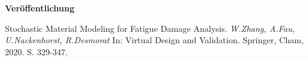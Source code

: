 \begin{minipage}{1\linewidth}
	\vspace{1em}
	\textcolor{color1}{\Large \textbf{Veröffentlichung}}
	\vspace{1em}
\end{minipage}
\small Stochastic Material Modeling for Fatigue Damage Analysis. \textit{W.Zhang, A.Fau, U.Nackenhorst, R.Desmorat}
 In: Virtual Design and Validation. Springer, Cham, 2020. S. 329-347. \\

